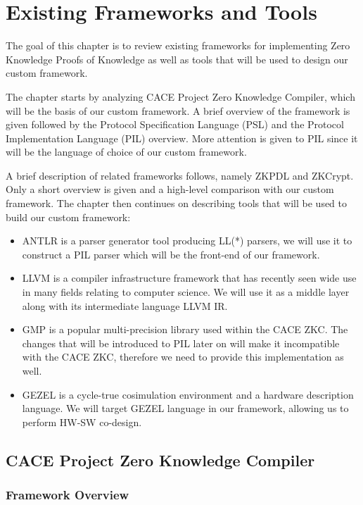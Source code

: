 \chapter{Existing Frameworks and Tools}

The goal of this chapter is to review existing frameworks for
implementing Zero Knowledge Proofs of Knowledge as well as tools that
will be used to design our custom framework.

The chapter starts by analyzing CACE Project Zero Knowledge Compiler,
which will be the basis of our custom framework. A brief overview of
the framework is given followed by the Protocol Specification Language
(PSL) and the Protocol Implementation Language (PIL) overview. More
attention is given to PIL since it will be the language of choice of
our custom framework.

A brief description of related frameworks follows, namely ZKPDL and
ZKCrypt. Only a short overview is given and a high-level comparison
with our custom framework. The chapter then continues on describing
tools that will be used to build our custom framework:
\begin{itemize}
\item ANTLR is a parser generator tool producing LL(*) parsers, we
  will use it to construct a PIL parser which will be the front-end of
  our framework.
\item LLVM is a compiler infrastructure framework that has recently
  seen wide use in many fields relating to computer science. We will
  use it as a middle layer along with its intermediate language LLVM
  IR.
\item GMP is a popular multi-precision library used within the CACE
  ZKC. The changes that will be introduced to PIL later on will make
  it incompatible with the CACE ZKC, therefore we need to provide this
  implementation as well.
\item GEZEL is a cycle-true cosimulation environment and a hardware
  description language. We will target GEZEL language in our
  framework, allowing us to perform HW-SW co-design.
\end{itemize}

\section{CACE Project Zero Knowledge Compiler}
\label{sec:cace}

\subsection{Framework Overview}

